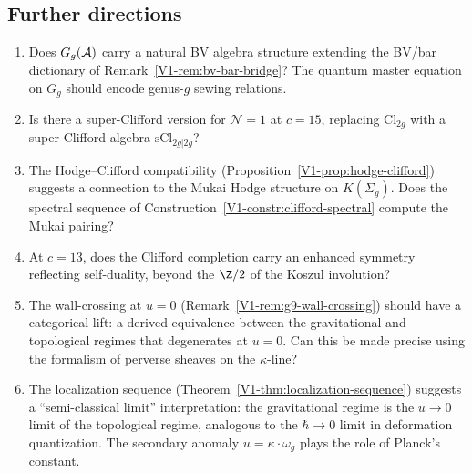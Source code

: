%
%

\subsection{Further directions}

\begin{remark}
\begin{enumerate}[label=\textup{(\alph*)}]
\item Does $G_g(\mathcal{A})$ carry a natural BV algebra structure
extending the BV/bar dictionary of Remark~\ref{V1-rem:bv-bar-bridge}? The quantum master
equation on $G_g$ should encode genus-$g$ sewing relations.

\item Is there a super-Clifford version for $\mathcal{N} = 1$ at
$c = 15$, replacing $\mathrm{Cl}_{2g}$ with a super-Clifford algebra
$\mathrm{sCl}_{2g|2g}$?

\item The Hodge--Clifford compatibility
(Proposition~\ref{V1-prop:hodge-clifford}) suggests a connection to the
Mukai Hodge structure on $K(\Sigma_g)$. Does the spectral sequence of
Construction~\ref{V1-constr:clifford-spectral} compute the Mukai pairing?

\item At $c = 13$, does the Clifford completion carry an enhanced
symmetry reflecting self-duality, beyond the $\Z/2$ of the Koszul
involution?

\item The wall-crossing at $u = 0$
(Remark~\ref{V1-rem:g9-wall-crossing}) should have a categorical lift:
a derived equivalence between the gravitational and topological
regimes that degenerates at $u = 0$. Can this be made precise using
the formalism of perverse sheaves on the $\kappa$-line?

\item The localization sequence
(Theorem~\ref{V1-thm:localization-sequence}) suggests a
``semi-classical limit'' interpretation: the gravitational regime is
the $u \to 0$ limit of the topological regime, analogous to the
$\hbar \to 0$ limit in deformation quantization. The secondary
anomaly $u = \kappa \cdot \omega_g$ plays the role of Planck's
constant.
\end{enumerate}
\end{remark}

